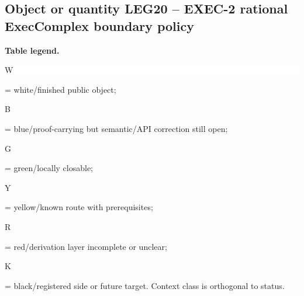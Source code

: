 \subsection*{Object or quantity LEG20 -- EXEC-2 rational ExecComplex boundary policy}
\hypertarget{objproof:LEG20}{}
\par\smallskip\noindent\begin{minipage}{0.99\linewidth}\footnotesize\raggedright\textbf{Table legend.} \colorbox{white}{\strut W} = white/finished public object; \colorbox{cyan!20}{\strut B} = blue/proof-carrying but semantic/API correction still open; \colorbox{green!18}{\strut G} = green/locally closable; \colorbox{yellow!25}{\strut Y} = yellow/known route with prerequisites; \colorbox{red!20}{\strut R} = red/derivation layer incomplete or unclear; \colorbox{black!18}{\strut K} = black/registered side or future target. Context class is orthogonal to status.\end{minipage}\par\vspace{0.25em}
